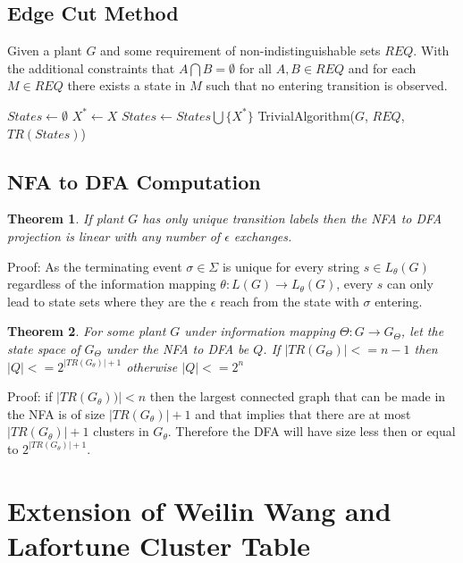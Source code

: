 \documentclass{article}
\newtheorem{thm}{Theorem}
\begin{document}
		\subsection{Edge Cut Method}
			Given a plant $G$ and some requirement of non-indistinguishable sets $REQ$. With the additional constraints that $A \bigcap B = \emptyset$ for all $A,B\in REQ$ and for each $M\in REQ$ there exists a state in $M$ such that no entering transition is observed.

			\begin{algorithmic}[5]
				\STATE $States \leftarrow \emptyset$
							\STATE $X^* \leftarrow X$
						\ENDIF
					\ENDFOR
					\STATE $States \leftarrow States \bigcup \{X^*\}$
				\ENDFOR
				\RETURN TrivialAlgorithm($G$, $REQ$, $TR(States)$)
			\end{algorithmic}

		\subsection{NFA to DFA Computation}
			\begin{thm}
			If plant $G$ has only unique transition labels then the NFA to DFA projection is linear with any number of $\epsilon$ exchanges.
			\end{thm} 

			Proof: As the terminating event $\sigma \in \Sigma$ is unique for every string $s \in L_\theta(G)$ regardless of the information mapping $\theta : L(G) \rightarrow L_\theta(G)$, every $s$ can only lead to state sets where they are the $\epsilon$ reach from the state with $\sigma$ entering.

			\begin{thm}
			For some plant $G$ under information mapping $\Theta: G \rightarrow G_\Theta$, let the state space of $G_\Theta$ under the NFA to DFA be $Q$. If $|TR(G_\Theta)| <= n - 1$ then $|Q| <= 2^{|TR(G_\theta)|+1}$ otherwise $|Q| <= 2^n$
			\end{thm}

			Proof: if $|TR(G_\theta))| < n$ then the largest connected graph that can be made in the NFA is of size $|TR(G_\theta)|+1$ and that implies that there are at most $|TR(G_\theta)|+1$ clusters in $G_\theta$. Therefore the DFA will have size less then or equal to $2^{|TR(G_\theta)|+1}$.

		\section{Extension of Weilin Wang and Lafortune Cluster Table}
\end{document}
